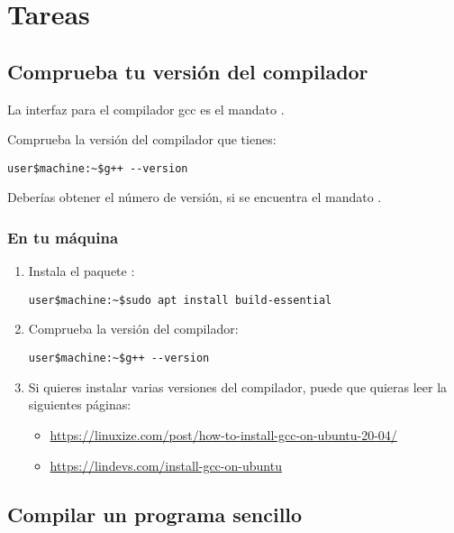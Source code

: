 \section{Tareas}

\subsection{Comprueba tu versión del compilador}

La interfaz para el compilador gcc es el mandato .

Comprueba la versión del compilador que tienes:

\begin{lstlisting}[style=terminal]
user$machine:~$g++ --version
\end{lstlisting}

Deberías obtener el número de versión, si se encuentra el mandato .

\subsubsection{En tu máquina}

\begin{enumerate}

\item Instala el paquete :

\begin{lstlisting}[style=terminal]
user$machine:~$sudo apt install build-essential
\end{lstlisting}

\item Comprueba la versión del compilador:

\begin{lstlisting}[style=terminal]
user$machine:~$g++ --version
\end{lstlisting}

\item Si quieres instalar varias versiones del compilador,
      puede que quieras leer la siguientes páginas:
  \begin{itemize}
    \item \url{https://linuxize.com/post/how-to-install-gcc-on-ubuntu-20-04/}
    \item \url{https://lindevs.com/install-gcc-on-ubuntu}
  \end{itemize}
\end{enumerate}

\subsection{Compilar un programa sencillo}

